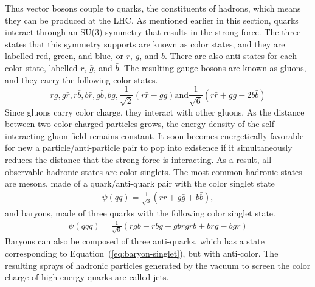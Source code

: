 Thus vector bosons couple to quarks, the constituents of hadrons,
which means they can be produced at the LHC.
As mentioned earlier in this section,
quarks interact through an SU(3) symmetry that results in the strong force.
The three states that this symmetry supports are known as color states,
and they are labelled red, green, and blue, or $r$, $g$, and $b$.
There are also anti-states for each color state,
labelled $\bar{r}$, $\bar{g}$, and $\bar{b}$.
The resulting gauge bosons are known as gluons, and they carry the following color states.
\[
r\bar{g}, g\bar{r}, r\bar{b}, b\bar{r}, g\bar{b}, b\bar{g}, \frac{1}{\sqrt{2}}(r\bar{r} - g\bar{g}) \mathrm{and} \frac{1}{\sqrt{6}}(r\bar{r} + g\bar{g} - 2b\bar{b})
\]
Since gluons carry color charge, they interact with other gluons.
As the distance between two color-charged particles grows,
the energy density of the self-interacting gluon field remains constant.
It soon becomes energetically favorable for new a particle/anti-particle pair
to pop into existence if it simultaneously reduces the distance that the strong force is interacting.
As a result, all observable hadronic states are color singlets.
The most common hadronic states are mesons, made of a quark/anti-quark pair
with the color singlet state
\begin{gather}
  \psi(q\bar{q}) = \frac1{\sqrt{3}} (r\bar{r} + g\bar{g} + b\bar{b}),
\end{gather}
and baryons, made of three quarks with the following color singlet state.
\begin{gather}
  \psi(qqq) = \frac{1}{\sqrt{6}}(rgb - rbg + gbr  grb + brg - bgr) \label{eq:baryon-singlet}
\end{gather}
Baryons can also be composed of three anti-quarks,
which has a state corresponding to Equation~(\ref{eq:baryon-singlet}),
but with anti-color.
The resulting sprays of hadronic particles generated by the vacuum to screen the color charge of high energy quarks
are called jets.

